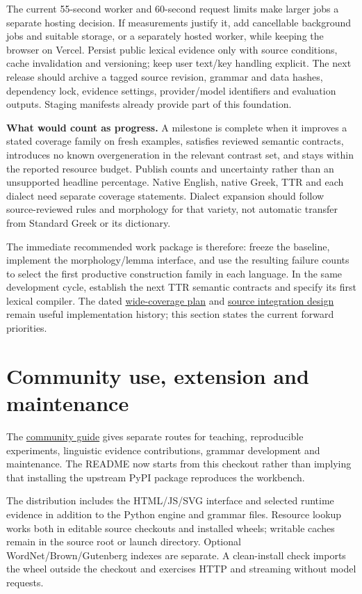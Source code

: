 \documentclass[11pt,a4paper]{article}
\begin{document}
The current 55-second worker and 60-second request limits make larger
jobs a separate hosting decision. If measurements justify it, add
cancellable background jobs and suitable storage, or a separately hosted
worker, while keeping the browser on Vercel. Persist public lexical
evidence only with source conditions, cache invalidation and versioning;
keep user text/key handling explicit. The next release should archive a
tagged source revision, grammar and data hashes, dependency lock,
evidence settings, provider/model identifiers and evaluation outputs.
Staging manifests already provide part of this foundation.

\textbf{What would count as progress.} A milestone is complete when it
improves a stated coverage family on fresh examples, satisfies reviewed
semantic contracts, introduces no known overgeneration in the relevant
contrast set, and stays within the reported resource budget. Publish
counts and uncertainty rather than an unsupported headline percentage.
Native English, native Greek, TTR and each dialect need separate
coverage statements. Dialect expansion should follow source-reviewed
rules and morphology for that variety, not automatic transfer from
Standard Greek or its dictionary.

The immediate recommended work package is therefore: freeze the
baseline, implement the morphology/lemma interface, and use the
resulting failure counts to select the first productive construction
family in each language. In the same development cycle, establish the
next TTR semantic contracts and specify its first lexical compiler. The
dated \href{design/wide-coverage-plan.md}{wide-coverage plan} and
\href{design/svarna-lexical-integration.md}{source integration design}
remain useful implementation history; this section states the current
forward priorities.

\section{Community use, extension and
maintenance}\label{community-use-extension-and-maintenance}

The \href{community/README.md}{community guide} gives separate routes
for teaching, reproducible experiments, linguistic evidence
contributions, grammar development and maintenance. The README now
starts from this checkout rather than implying that installing the
upstream PyPI package reproduces the workbench.

The distribution includes the HTML/JS/SVG interface and selected runtime
evidence in addition to the Python engine and grammar files. Resource
lookup works both in editable source checkouts and installed wheels;
writable caches remain in the source root or launch directory. Optional
WordNet/Brown/Gutenberg indexes are separate. A clean-install check
imports the wheel outside the checkout and exercises HTTP and streaming
without model requests.
\end{document}
